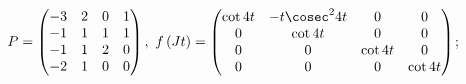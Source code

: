 \begin{enumsolsfull}
		\item \( P = \begin{pmatrix} -3 & 2 & 0 & 1 \\ -1 & 1 & 1 & 1 \\ -1 & 1 & 2 & 0 \\ -2 & 1 & 0 & 0 \end{pmatrix}, ~ f \pares{Jt} = \begin{pmatrix} \cot{4t} & -t \cosec^2{4t} & 0 & 0 \\ 0 & \cot{4t} & 0 & 0 \\ 0 & 0 & \cot{4t} & 0 \\ 0 & 0 & 0 & \cot{4t} \end{pmatrix} \); %

\end{enumsolsfull}
